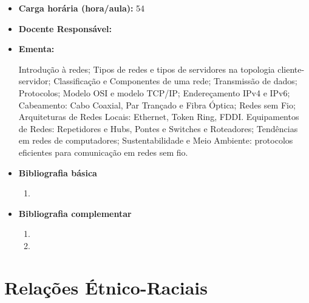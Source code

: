 \documentclass[11pt,fleqn]{book} %
\begin{document}
\begin{itemize}
	\item \textbf{Carga horária (hora/aula):} 54
	\item \textbf{Docente Responsável:}~
	\item \textbf{Ementa:} 

	Introdução à redes; 
	Tipos de redes e tipos de servidores na topologia cliente-servidor; Classificação e Componentes de uma rede;
	Transmissão de dados;
	Protocolos; 
	Modelo OSI e modelo TCP/IP; 
	Endereçamento IPv4 e IPv6; 
	Cabeamento: Cabo Coaxial, Par Trançado e Fibra Óptica;
	Redes sem Fio;
	Arquiteturas de Redes Locais: Ethernet, Token Ring, FDDI. Equipamentos de Redes: Repetidores e Hubs, Pontes e Switches e Roteadores;
	Tendências em redes de computadores;
	Sustentabilidade e Meio Ambiente: protocolos eficientes para comunicação em redes sem fio.
	
	\item \textbf{Bibliografia básica}
	\begin{enumerate}
		\item 
	\end{enumerate}
	\item \textbf{Bibliografia complementar}
	\begin{enumerate}
		\item
		\item 
	\end{enumerate}
\end{itemize}


\newpage
\section{Relações Étnico-Raciais}\label{disc:etnicoraciais}
\end{document}
